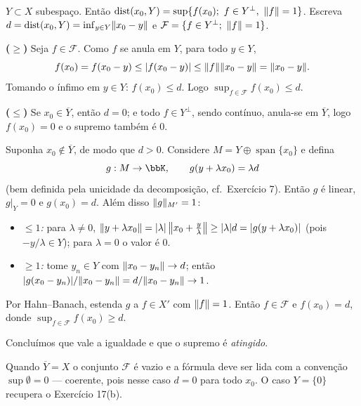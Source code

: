 \begin{exercicio}{$Y\subset X$ subespaço. Então $\dist(x_0,Y)=\sup\{f(x_0);\ f\in Y^\perp,\ \norm{f}=1\}$.}
\sol
Escreva $d=\operatorname{dist}(x_0,Y)=\inf_{y\in Y}\lVert x_0-y\rVert$ e $\mathcal{F}=\{f\in Y^\perp;\ \norm{f}=1\}$.

\textbf{($\ge$)} Seja $f\in\mathcal{F}$. Como $f$ se anula em $Y$, para todo $y\in Y$,
\[ f(x_0)=f(x_0-y)\le\lvert f(x_0-y)\rvert\le\lVert f\rVert\lVert x_0-y\rVert=\lVert x_0-y\rVert. \]
Tomando o ínfimo em $y\in Y$: $f(x_0)\le d$. Logo $\sup_{f\in\mathcal{F}}f(x_0)\le d$.

\textbf{($\le$)} Se $x_0\in\overline{Y}$, então $d=0$; e todo $f\in Y^\perp$, sendo contínuo, anula-se em $\overline{Y}$, logo $f(x_0)=0$ e o supremo também é $0$.

Suponha $x_0\notin\overline{Y}$, de modo que $d>0$. Considere $M=Y\oplus\operatorname{span}\{x_0\}$ e defina
\[ g:M\to\K,\qquad g(y+\lambda x_0)=\lambda d \]
(bem definida pela unicidade da decomposição, cf.\ Exercício 7). Então $g$ é linear, $g|_Y=0$ e $g(x_0)=d$. Além disso $\lVert g\rVert_{M'}=1$:
\begin{itemize}[leftmargin=1.4em,itemsep=1pt]
\item \emph{$\le1$:} para $\lambda\neq0$, $\lVert y+\lambda x_0\rVert=\lvert\lambda\rvert\,\bigl\|x_0+\tfrac{y}{\lambda}\bigr\|\ge\lvert\lambda\rvert d=\lvert g(y+\lambda x_0)\rvert$ (pois $-y/\lambda\in Y$); para $\lambda=0$ o valor é $0$.
\item \emph{$\ge1$:} tome $y_n\in Y$ com $\lVert x_0-y_n\rVert\to d$; então $\lvert g(x_0-y_n)\rvert/\lVert x_0-y_n\rVert=d/\lVert x_0-y_n\rVert\to1$.
\end{itemize}
Por Hahn--Banach, estenda $g$ a $f\in X'$ com $\lVert f\rVert=1$. Então $f\in\mathcal{F}$ e $f(x_0)=d$, donde $\sup_{f\in\mathcal{F}}f(x_0)\ge d$.

Concluímos que vale a igualdade e que o supremo é \emph{atingido}.

\begin{obs}
Quando $\overline{Y}=X$ o conjunto $\mathcal{F}$ é vazio e a fórmula deve ser lida com a convenção $\sup\emptyset=0$ --- coerente, pois nesse caso $d=0$ para todo $x_0$. O caso $Y=\{0\}$ recupera o Exercício 17(b).
\end{obs}
\end{exercicio}
